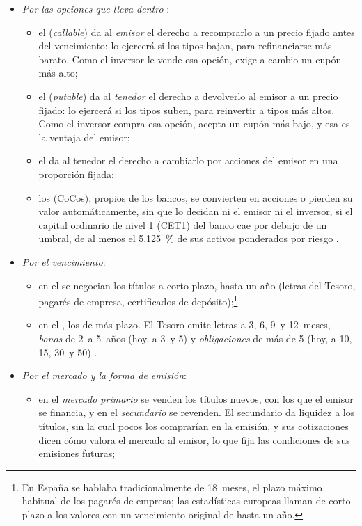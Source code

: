 \documentclass[11pt]{article}
\begin{document}
\begin{itemize}
\item \emph{Por las opciones que lleva dentro} :
    \begin{itemize}
    \item el  (\emph{callable}) da al \emph{emisor} el derecho a recomprarlo a un precio fijado antes del vencimiento: lo ejercerá si los tipos bajan, para refinanciarse más barato. Como el inversor le vende esa opción, exige a cambio un cupón más alto;
    \item el  (\emph{putable}) da al \emph{tenedor} el derecho a devolverlo al emisor a un precio fijado: lo ejercerá si los tipos suben, para reinvertir a tipos más altos. Como el inversor compra esa opción, acepta un cupón más bajo, y esa es la ventaja del emisor;
    \item el  da al tenedor el derecho a cambiarlo por acciones del emisor en una proporción fijada;
    \item los  (CoCos), propios de los bancos, se convierten en acciones o pierden su valor automáticamente, sin que lo decidan ni el emisor ni el inversor, si el capital ordinario de nivel 1 (CET1) del banco cae por debajo de un umbral, de al menos el 5,125~\% de sus activos ponderados por riesgo\nocite{UE2013CRR}  .
    \end{itemize}
\item \emph{Por el vencimiento}:
  \begin{itemize}
  \item en el  se negocian los títulos a corto plazo, hasta un año (letras del Tesoro, pagarés de empresa, certificados de depósito);\footnote{En España se hablaba tradicionalmente de 18~meses, el plazo máximo habitual de los pagarés de empresa; las estadísticas europeas llaman de corto plazo a los valores con un vencimiento original de hasta un año.}
  \item en el , los de más plazo. El Tesoro emite letras a 3, 6, 9~y 12~meses\nocite{Tesoro2026Letras}, \emph{bonos} de 2~a 5~años (hoy, a 3~y 5) y \emph{obligaciones} de más de 5 (hoy, a 10, 15, 30~y 50)\nocite{Tesoro2026BonosObligaciones} .
  \end{itemize}
\item \emph{Por el mercado y la forma de emisión}:
  \begin{itemize}
  \item en el \emph{mercado primario} se venden los títulos nuevos, con los que el emisor se financia, y en el \emph{secundario} se revenden. El secundario da liquidez a los títulos, sin la cual pocos los comprarían en la emisión, y sus cotizaciones dicen cómo valora el mercado al emisor, lo que fija las condiciones de sus emisiones futuras;

\end{itemize}
\end{itemize}
\end{document}
